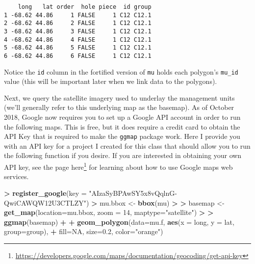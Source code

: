 \documentclass[]{krantz}
\makeatletter
\newenvironment{Shaded}{\begin{snugshade}}{\end{snugshade}}
\newcommand{\KeywordTok}[1]{\textcolor[rgb]{0.27,0.27,0.27}{\textbf{#1}}}
\newcommand{\DataTypeTok}[1]{\textcolor[rgb]{0.27,0.27,0.27}{#1}}
\newcommand{\DecValTok}[1]{\textcolor[rgb]{0.06,0.06,0.06}{#1}}
\newcommand{\FloatTok}[1]{\textcolor[rgb]{0.06,0.06,0.06}{#1}}
\newcommand{\StringTok}[1]{\textcolor[rgb]{0.5,0.5,0.5}{#1}}
\newcommand{\OtherTok}[1]{\textcolor[rgb]{0.37,0.37,0.37}{#1}}
\newcommand{\OperatorTok}[1]{\textcolor[rgb]{0.43,0.43,0.43}{\textbf{#1}}}
\newcommand{\ErrorTok}[1]{\textcolor[rgb]{0.14,0.14,0.14}{\textbf{#1}}}
\newcommand{\NormalTok}[1]{#1}
\renewcommand{\href}[2]{#2\footnote{\url{#1}}}
\newenvironment{kframe}{%
\medskip{}
\setlength{\fboxsep}{.8em}
 \def\at@end@of@kframe{}%
 \ifinner\ifhmode%
  \def\at@end@of@kframe{\end{minipage}}%
  \begin{minipage}{\columnwidth}%
 \fi\fi%
 \def\FrameCommand##1{\hskip\@totalleftmargin \hskip-\fboxsep
 \colorbox{shadecolor}{##1}\hskip-\fboxsep
     \hskip-\linewidth \hskip-\@totalleftmargin \hskip\columnwidth}%
 \MakeFramed {\advance\hsize-\width
   \@totalleftmargin\z@ \linewidth\hsize
   \@setminipage}}%
 {\par\unskip\endMakeFramed%
 \at@end@of@kframe}
\renewenvironment{Shaded}{\begin{kframe}}{\end{kframe}}
\theoremstyle{definition}
\theoremstyle{definition}
\theoremstyle{definition}
\theoremstyle{remark}
\makeatother
\begin{document}
\begin{verbatim}
    long   lat order  hole piece  id group
1 -68.62 44.86     1 FALSE     1 C12 C12.1
2 -68.62 44.86     2 FALSE     1 C12 C12.1
3 -68.62 44.86     3 FALSE     1 C12 C12.1
4 -68.62 44.86     4 FALSE     1 C12 C12.1
5 -68.62 44.86     5 FALSE     1 C12 C12.1
6 -68.62 44.86     6 FALSE     1 C12 C12.1
\end{verbatim}

Notice the \texttt{id} column in the fortified version of \texttt{mu}
holds each polygon's \texttt{mu\_id} value (this will be important later
when we link data to the polygons).

Next, we query the satellite imagery used to underlay the management
units (we'll generally refer to this underlying map as the basemap). As
of October 2018, Google now requires you to set up a Google API account
in order to run the following maps. This is free, but it does require a
credit card to obtain the API Key that is required to make the
\texttt{ggmap} package work. Here I provide you with an API key for a
project I created for this class that should allow you to run the
following function if you desire. If you are interested in obtaining
your own API key, see the page
\href{https://developers.google.com/maps/documentation/geocoding/get-api-key}{here}
for learning about how to use Google maps web services.

\begin{Shaded}
\begin{Highlighting}[]
\OperatorTok{>}\StringTok{ }\KeywordTok{register_google}\NormalTok{(}\DataTypeTok{key =} \StringTok{"AIzaSyBPAwSY5x8vQqlnG-QwiCAWQW12U3CTLZY"}\NormalTok{)}
\OperatorTok{>}\StringTok{ }\NormalTok{mu.bbox <-}\StringTok{ }\KeywordTok{bbox}\NormalTok{(mu)}
\OperatorTok{>}\StringTok{ }
\ErrorTok{>}\StringTok{ }\NormalTok{basemap <-}\StringTok{ }\KeywordTok{get_map}\NormalTok{(}\DataTypeTok{location=}\NormalTok{mu.bbox, }\DataTypeTok{zoom =} \DecValTok{14}\NormalTok{, }\DataTypeTok{maptype=}\StringTok{"satellite"}\NormalTok{)}
\OperatorTok{>}\StringTok{ }
\ErrorTok{>}\StringTok{ }\KeywordTok{ggmap}\NormalTok{(basemap) }\OperatorTok{+}
\OperatorTok{+}\StringTok{     }\KeywordTok{geom_polygon}\NormalTok{(}\DataTypeTok{data=}\NormalTok{mu.f, }\KeywordTok{aes}\NormalTok{(}\DataTypeTok{x =}\NormalTok{ long, }\DataTypeTok{y =}\NormalTok{ lat, }\DataTypeTok{group=}\NormalTok{group), }
\OperatorTok{+}\StringTok{                  }\DataTypeTok{fill=}\OtherTok{NA}\NormalTok{, }\DataTypeTok{size=}\FloatTok{0.2}\NormalTok{, }\DataTypeTok{color=}\StringTok{"orange"}\NormalTok{)}
\end{Highlighting}
\end{Shaded}
\end{document}
